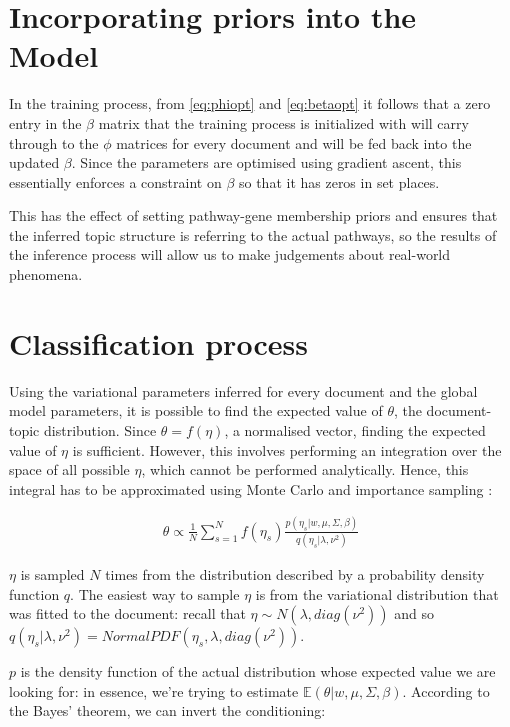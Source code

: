 \documentclass[12pt,a4paper,twoside,openright]{report}
\begin{document}


\section{Incorporating priors into the Model}

In the training process, from \eqref{eq:phiopt} and \eqref{eq:betaopt} it follows that a zero entry in the $\beta$ matrix that the training process is initialized with will carry through to the $\phi$ matrices for every document and will be fed back into the updated $\beta$. Since the parameters are optimised using gradient ascent, this essentially enforces a constraint on $\beta$ so that it has zeros in set places.

This has the effect of setting pathway-gene membership priors and ensures that the inferred topic structure is referring to the actual pathways, so the results of the inference process will allow us to make judgements about real-world phenomena.

\section{Classification process}

Using the variational parameters inferred for every document and the global model parameters, it is possible to find the expected value of $\theta$, the document-topic distribution. Since $\theta = f(\eta)$, a normalised vector, finding the expected value of $\eta$ is sufficient. However, this involves performing an integration over the space of all possible $\eta$, which cannot be performed analytically. Hence, this integral has to be approximated using Monte Carlo and importance sampling \cite{mcbook}:

\begin{align}
\hat\theta \propto \frac{1}{N}\sum\limits_{s=1}^N f(\eta_s) \frac{p(\eta_s | w, \mu, \Sigma, \beta)}{q(\eta_s | \lambda, \nu^2)}
\end{align}

$\eta$ is sampled $N$ times from the distribution described by a probability density function $q$. The easiest way to sample $\eta$ is from the variational distribution that was fitted to the document: recall that $\eta \sim N(\lambda, \mathit{diag}(\nu^2))$ and so $q(\eta_s | \lambda, \nu^2) = \mathit{NormalPDF}(\eta_s, \lambda, \mathit{diag}(\nu^2))$.

$p$ is the density function of the actual distribution whose expected value we are looking for: in essence, we're trying to estimate $\mathbb{E}(\theta | w, \mu, \Sigma, \beta)$. According to the Bayes' theorem, we can invert the conditioning:
\end{document}
